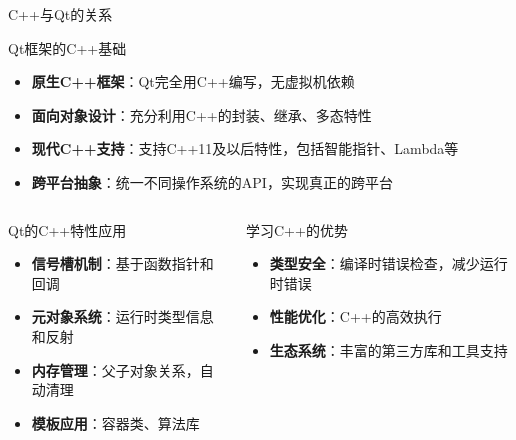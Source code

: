 \documentclass[UTF8,aspectratio=169]{beamer}
\begin{document}
\begin{frame}{C++与Qt的关系}
    \begin{ytublock}{Qt框架的C++基础}
        \begin{itemize}
            \item \textbf{原生C++框架}：Qt完全用C++编写，无虚拟机依赖
            \item \textbf{面向对象设计}：充分利用C++的封装、继承、多态特性
            \item \textbf{现代C++支持}：支持C++11及以后特性，包括智能指针、Lambda等
            \item \textbf{跨平台抽象}：统一不同操作系统的API，实现真正的跨平台
        \end{itemize}
    \end{ytublock}

    \begin{columns}
        \begin{column}{0.48\textwidth}
            \begin{ytublock}{Qt的C++特性应用}
                \begin{itemize}
                    \item \textbf{信号槽机制}：基于函数指针和回调
                    \item \textbf{元对象系统}：运行时类型信息和反射
                    \item \textbf{内存管理}：父子对象关系，自动清理
                    \item \textbf{模板应用}：容器类、算法库
                \end{itemize}
            \end{ytublock}
        \end{column}
        \begin{column}{0.48\textwidth}
            \begin{ytublock}{学习C++的优势}
                \begin{itemize}
                    \item \textbf{类型安全}：编译时错误检查，减少运行时错误
                    \item \textbf{性能优化}：C++的高效执行
                    \item \textbf{生态系统}：丰富的第三方库和工具支持
                \end{itemize}
            \end{ytublock}
        \end{column}
    \end{columns}
\end{frame}
\end{document}
